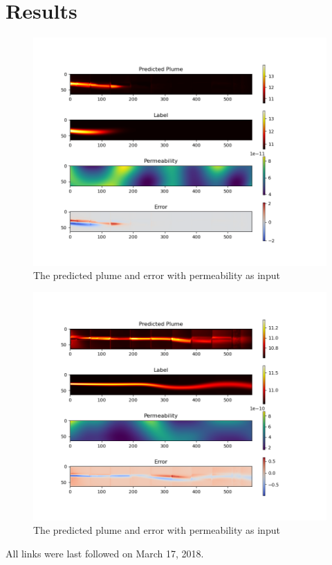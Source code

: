 \documentclass[
  a4paper,  %
  twoside,  %
  bibliography=totoc,
  headsepline,
  cleardoublepage=empty,
  parskip=half,
  draft=false
]{scrbook}
\begin{document}
\section{Results}
\begin{figure}
  \includegraphics[width=\textwidth, trim=0 18mm 1cm 0, clip]{graphics/predicted_plume_steps20_dp2_withPerm.png}
  \caption[dp 2 with perm]{The predicted plume and error with permeability as input}
\end{figure}
\begin{figure}
  \includegraphics[width=\textwidth, trim=0 18mm 1cm 0, clip]{graphics/predicted_plume_steps20_dp4_withPerm.png}
  \caption[dp 2 with perm]{The predicted plume and error with permeability as input}
\end{figure}


\printbibliography

All links were last followed on March 17, 2018.

\appendix


\pagestyle{empty}
\renewcommand*{\chapterpagestyle}{empty}
\Versicherung
\end{document}
